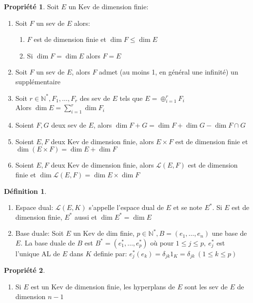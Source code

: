 \documentclass[fleqn]{article}
\theoremstyle{definition} \newtheorem*{defi}{D\'efinition}
\theoremstyle{definition} \newtheorem*{theo}{Th\'eor\`eme}
\theoremstyle{definition} \newtheorem*{coro}{Corollaire}
\theoremstyle{definition} \newtheorem*{nota}{Notation}
\theoremstyle{remark} \newtheorem*{rqs}{Remarques}
\theoremstyle{definition} \newtheorem*{prop}{Propri\'et\'e}
\begin{document}
\begin{prop} Soit $E$ un Kev de dimension finie:
	\begin{enumerate}
		\item Soit $F$ un sev de $E$ alors:
			\begin{enumerate}
				\item $F$ est de dimension finie et $\dim F \leq \dim E$
				\item Si $\dim F = \dim E$ alors $F=E$
			\end{enumerate}
		\item Soit $F$ un sev de $E$, alors $F$ admet (au moins 1, en g\'en\'eral une infinit\'e) un suppl\'ementaire
		\item Soit $r \in \mathbb{N}^*, F_1, \hdots, F_r$ des sev de $E$ tels que $E = \oplus_{i=1}^r F_i$\\
			Alors $\dim E = \sum_{i=1}^r \dim F_i$
		\item Soient $F,G$ deux sev de $E$, alors $\dim F+G = \dim F + \dim G - \dim F \cap G$
		\item Soient $E,F$ deux Kev de dimension finie, alors $E\times F$ est de dimension finie et $\dim (E\times F) = \dim E + \dim F$
		\item Soient $E,F$ deux Kev de dimension finie, alors $\mathscr{L}(E,F)$ est de dimension finie et $\dim \mathscr{L}(E,F) = \dim E
			\times \dim F$
	\end{enumerate}
\end{prop}

\begin{defi} $ $
	\begin{enumerate}
		\item Espace dual: $\mathscr{L}(E,K)$ s'appelle l'espace dual de $E$ et se note $E^*$. Si $E$ est de dimension finie, $E^*$
			aussi et $\dim E^* = \dim E$
		\item Base duale: Soit $E$ un Kev de dim finie, $p \in \mathbb{N}^*, B = (e_1, \hdots, e_n)$ une base de $E$. La base duale de $B$
			est $B^* = (e_1^*, \hdots, e_p^*)$ o\`u pour $1 \leq j \leq p,\ e_j^*$ est l'unique AL de $E$ dans $K$ definie par:
			$e_j^*(e_k) = \delta_{jk} 1_K = \delta_{jk}\ (1 \leq k \leq p)$
	\end{enumerate}
\end{defi}

\begin{prop} $ $
	\begin{enumerate}
		\item Si $E$ est un Kev de dimension finie, les hyperplans de $E$ sont les sev de $E$ de dimension $n-1$
	\end{enumerate}
\end{prop}
\end{document}
